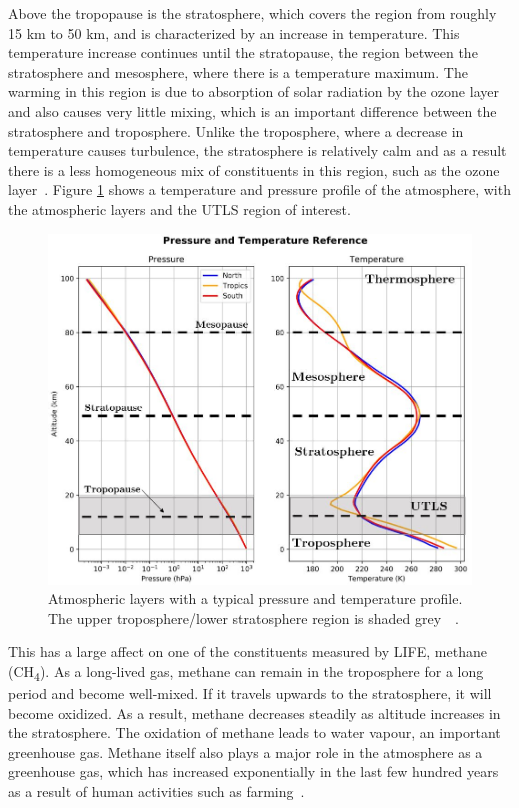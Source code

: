 Above the tropopause is the stratosphere, which covers the region from roughly 15 km to 50 km, and is characterized by an increase in temperature. This temperature increase continues until the stratopause, the region between the stratosphere and mesosphere, where there is a temperature maximum. The warming in this region is due to absorption of solar radiation by the ozone layer and also causes very little mixing, which is an important difference between the stratosphere and troposphere. Unlike the troposphere, where a decrease in temperature causes turbulence, the stratosphere is relatively calm and as a result there is a less homogeneous mix of constituents in this region, such as the ozone layer~\citep{atmos_science}. Figure \ref{fig:atm_layers} shows a temperature and pressure profile of the atmosphere, with the atmospheric layers and the UTLS region of interest.

 \begin{figure}
\centering
  \includegraphics[width=\linewidth]{chap2_images/atmospheric_layers.JPG}
  \caption{Atmospheric layers with a typical pressure and temperature profile. The upper troposphere/lower stratosphere region is shaded grey~\citep{MSIS_model_for_profile}~\citep{ERA_interim_dataset_for_profile}.}
  \label{fig:atm_layers}
\end{figure}

 This has a large affect on one of the constituents measured by LIFE, methane (CH\textsubscript{4}). As a long-lived gas, methane can remain in the troposphere for a long period and become well-mixed. If it travels upwards to the stratosphere, it will become oxidized. As a result, methane decreases steadily as altitude increases in the stratosphere. The oxidation of methane leads to water vapour, an important greenhouse gas. Methane itself also plays a major role in the atmosphere as a greenhouse gas, which has increased exponentially in the last few hundred years as a result of human activities such as farming~\citep{atmos_phys_and_climate}. 

